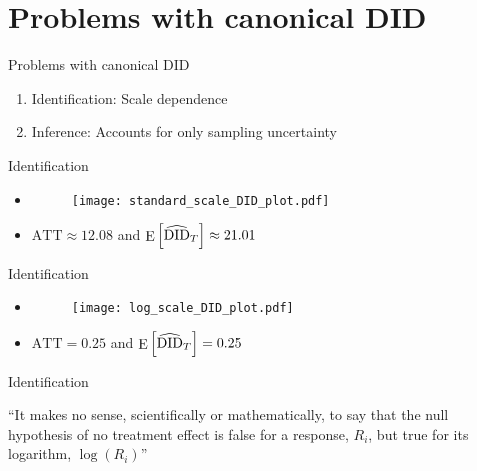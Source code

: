 \documentclass[table, xcolor = {dvipsnames}, 9pt]{beamer}
\theoremstyle{plain}
\DeclareMathOperator{\E}{\rm{E}}
\begin{document}
\section{Problems with canonical DID}
\begin{frame}{Problems with canonical DID}
\vfill
\begin{enumerate} \vfill
\item Identification: Scale dependence \vfill
\item Inference: Accounts for only sampling uncertainty \vfill
\end{enumerate} \vfill
\end{frame}
\begin{frame}{Identification}
\begin{itemize}
\item[] 
\begin{figure}[H]
\texttt{[image: standard\_scale\_DID\_plot.pdf]}
\end{figure}
\item $\text{ATT} \approx 12.08$ and $\E\left[\widehat{\text{DID}}_{T}\right] \approx 21.01$ 
\end{itemize}
\end{frame}
\begin{frame}{Identification}
\begin{itemize}
\item[] 
\begin{figure}[H]
\texttt{[image: log\_scale\_DID\_plot.pdf]}
\end{figure}
\item $\text{ATT} = 0.25$ and $\E\left[\widehat{\text{DID}}_{T}\right] = 0.25$  
\end{itemize}
\end{frame}
\begin{frame}{Identification}
\begin{center}
``It makes no sense, scientifically or mathematically, to say that the null hypothesis of no treatment effect is false for a response, $R_i$, but true for its logarithm, $\log\left(R_i\right)$'' \citep[][p.~164]{rosenbaum2017}
\end{center}
\end{frame}
\end{document}
